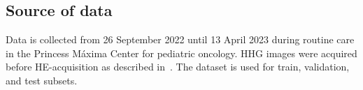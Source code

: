 \subsection{Source of data}

Data is collected from 26 September 2022 until 13 April 2023 during routine care in the Princess Máxima Center for pediatric oncology.
HHG images were acquired before HE-acquisition as described in~.
The dataset is used for train, validation, and test subsets.
